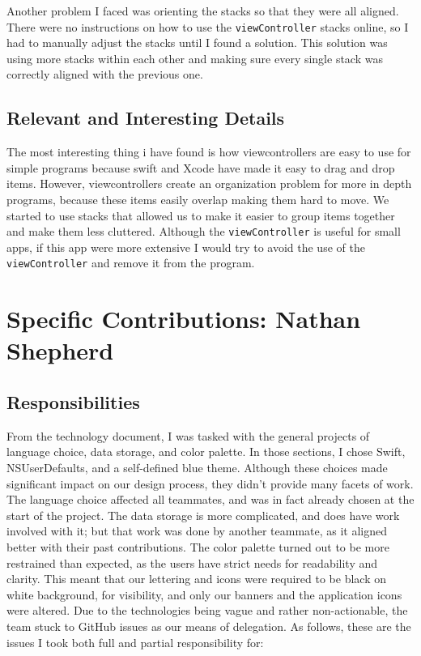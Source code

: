 \documentclass[onecolumn, draftclsnofoot,10pt, compsoc]{IEEEtran}
\begin{document}
    Another problem I faced was orienting the stacks so that they were all aligned.
    There were no instructions on how to use the \texttt{viewController} stacks online, so I had to manually adjust the stacks until I found a solution.
    This solution was using more stacks within each other and making sure every single stack was correctly aligned with the previous one.

\subsection{Relevant and Interesting Details}

The most interesting thing i have found is how viewcontrollers are easy to use for simple programs because swift and Xcode have made it easy to drag and drop items.
However, viewcontrollers create an organization problem for more in depth programs, because these items easily overlap making them hard to move.
We started to use stacks that allowed us to make it easier to group items together and make them less cluttered.
Although the \texttt{viewController} is useful for small apps, if this app were more extensive I would try to avoid the use of the \texttt{viewController} and remove it from the program.


\section{Specific Contributions: Nathan Shepherd}

\subsection{Responsibilities}

From the technology document, I was tasked with the general projects of language choice, data storage, and color palette.
In those sections, I chose Swift, NSUserDefaults, and a self-defined blue theme.
Although these choices made significant impact on our design process, they didn't provide many facets of work.
The language choice affected all teammates, and was in fact already chosen at the start of the project.
The data storage is more complicated, and does have work involved with it; but that work was done by another teammate, as it aligned better with their past contributions.
The color palette turned out to be more restrained than expected, as the users have strict needs for readability and clarity.
This meant that our lettering and icons were required to be black on white background, for visibility, and only our banners and the application icons were altered.
Due to the technologies being vague and rather non-actionable, the team stuck to GitHub issues as our means of delegation.
As follows, these are the issues I took both full and partial responsibility for:
\end{document}
